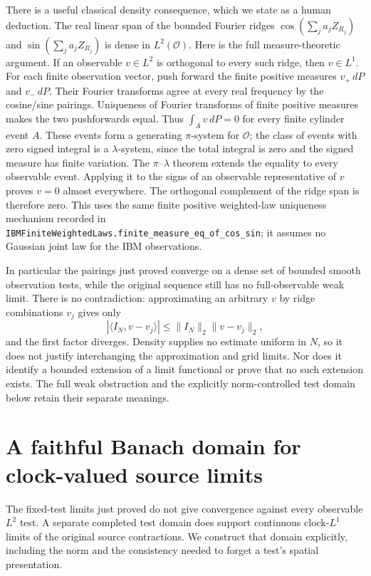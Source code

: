 \documentclass[11pt]{article}
\theoremstyle{remark}\newtheorem{remark}[theorem]{Remark}
\newcommand{\code}[1]{{\small\nolinkurl{#1}}}
\begin{document}
There is a useful classical density consequence, which we state as
a human deduction. The real linear span of the bounded Fourier
ridges $\cos(\sum_j a_j Z_{R_j})$ and
$\sin(\sum_j a_j Z_{R_j})$ is dense in $L^2(\mathcal O)$.
Here is the full measure-theoretic argument. If an observable
$v\in L^2$ is orthogonal to every such ridge, then $v\in L^1$.
For each finite observation vector, push forward the finite positive
measures $v_+\,dP$ and $v_-\,dP$. Their Fourier transforms agree at
every real frequency by the cosine/sine pairings. Uniqueness of
Fourier transforms of finite positive measures makes the two
pushforwards equal. Thus $\int_A v\,dP=0$ for every finite cylinder
event $A$. These events form a generating $\pi$-system for
$\mathcal O$; the class of events with zero signed integral is a
$\lambda$-system, since the total integral is zero and the signed
measure has finite variation. The $\pi$--$\lambda$ theorem extends
the equality to every observable event. Applying it to the signs of
an observable representative of $v$ proves $v=0$ almost everywhere.
The orthogonal complement of the ridge span is therefore zero.
This uses the same finite positive weighted-law uniqueness mechanism
recorded in \code{IBMFiniteWeightedLaws.finite_measure_eq_of_cos_sin};
it assumes no Gaussian joint law for the IBM observations.

In particular the pairings just proved converge on a dense set of
bounded smooth observation tests, while the original sequence still
has no full-observable weak limit. There is no contradiction:
approximating an arbitrary $v$ by ridge combinations $v_j$ gives
only
\[
 |\langle I_N,v-v_j\rangle|\leq\|I_N\|_2\|v-v_j\|_2,
\]
and the first factor diverges. Density supplies no estimate uniform
in $N$, so it does not justify interchanging the approximation and
grid limits. Nor does it identify a bounded extension of a limit
functional or prove that no such extension exists. The full weak
obstruction and the explicitly norm-controlled test domain below
retain their separate meanings.

\section{A faithful Banach domain for clock-valued source limits}
The fixed-test limits just proved do not give convergence against every
observable $L^2$ test. A separate completed test domain does support
continuous clock-$L^1$ limits of the original source contractions.
We construct that domain explicitly, including the norm and the
consistency needed to forget a test's spatial presentation.
\end{document}
